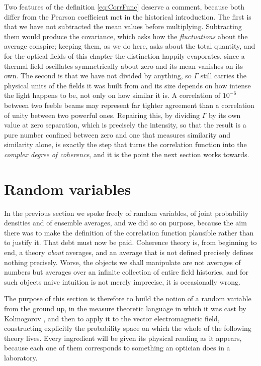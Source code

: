 	Two features of the definition \eqref{eq:CorrFunc} deserve a comment, because both differ
	from the Pearson coefficient met in the historical introduction. The first is that we have
	not subtracted the mean values before multiplying. Subtracting them would produce the
	covariance, which asks how the \textit{fluctuations} about the average conspire; keeping
	them, as we do here, asks about the total quantity, and for the optical fields of this
	chapter the distinction happily evaporates, since a thermal field oscillates symmetrically
	about zero and its mean vanishes on its own. The second is that we have not divided by
	anything, so $\Gamma$ still carries the physical units of the fields it was built from and
	its size depends on how intense the light happens to be, not only on how similar it is. A
	correlation of $10^{-6}$ between two feeble beams may represent far tighter agreement than a
	correlation of unity between two powerful ones. Repairing this, by dividing $\Gamma$ by its
	own value at zero separation, which is precisely the intensity, so that the result is a pure
	number confined between zero and one that measures similarity and similarity alone, is
	exactly the step that turns the correlation function into the \textit{complex degree of
	coherence}, and it is the point the next section works towards.

\section{Random variables}\label{sec:RandomVariables}

	In the previous section we spoke freely of random variables, of joint probability
	densities and of ensemble averages, and we did so on purpose, because the aim there was to
	make the definition of the correlation function plausible rather than to justify it. That
	debt must now be paid. Coherence theory is, from beginning to end, a theory \textit{about}
	averages, and an average that is not defined precisely defines nothing precisely. Worse,
	the objects we shall manipulate are not averages of numbers but averages over an infinite
	collection of entire field histories, and for such objects naive intuition is not merely
	imprecise, it is occasionally wrong.

	The purpose of this section is therefore to build the notion of a random variable from the
	ground up, in the measure theoretic language in which it was cast by Kolmogorov
	\citep{kolmogorov1933grundbegriffe}, and then to apply it to the vector electromagnetic
	field, constructing explicitly the probability space on which the whole of the following
	theory lives. Every ingredient will be given its physical reading as it appears, because
	each one of them corresponds to something an optician does in a laboratory.

